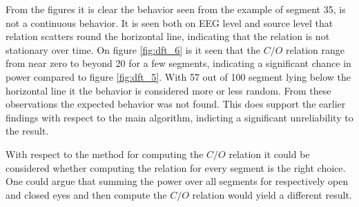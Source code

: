 \noindent
From the figures it is clear the behavior seen from the example of segment 35, is not a continuous behavior. 
It is seen both on EEG level and source level that relation scatters round the horizontal line, indicating that the relation is not stationary over time. 
On figure \ref{fig:dft_6} is it seen that the $C/O$ relation range from near zero to beyond 20 for a few segments, indicating a significant chance in power compared to figure \ref{fig:dft_5}. 
With 57 out of 100 segment lying below the horizontal line it the behavior is considered more or less random. 
From these observations the expected behavior was not found. 
This does support the earlier findings with respect to the main algorithm, indicting a significant unreliability to the result.

With respect to the method for computing the $C/O$ relation it could be considered whether computing the relation for every segment is the right choice. 
One could argue that summing the power over all segments for respectively open and closed eyes and then compute the $C/O$ relation would yield a different result.  